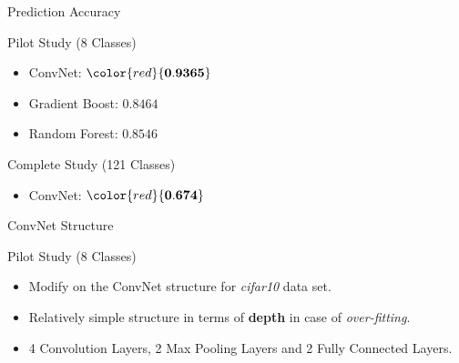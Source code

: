 \documentclass[mathserif]{beamer}
\begin{document}
\begin{frame}{Prediction Accuracy}
\begin{block}{Pilot Study (8 Classes)}
\begin{itemize}
\item ConvNet: $\color{red}{\mathbf{0.9365}}$
\item Gradient Boost: $0.8464$
\item Random Forest: $0.8546$
\end{itemize}
\end{block}

\begin{block}{Complete Study (121 Classes)}
\begin{itemize}
\item ConvNet: $\color{red}{\mathbf{0.674}}$
\end{itemize}
\end{block}
\end{frame}


\begin{frame}{ConvNet Structure}
\begin{block}{Pilot Study (8 Classes)}
\begin{itemize}
\item Modify on the ConvNet structure for \textit{cifar10} data set.
\item Relatively simple structure in terms of \textbf{depth} in case of \textit{over-fitting}.
\item 4 Convolution Layers, 2 Max Pooling Layers and 2 Fully Connected Layers.
\end{itemize}
\end{block}
\end{frame}
\end{document}

